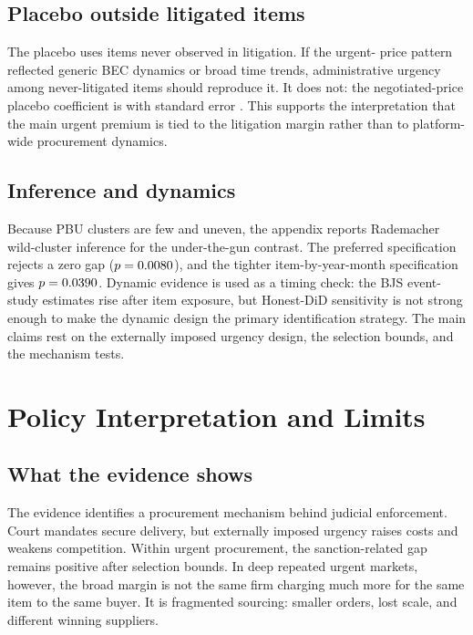 \subsection{Placebo outside litigated items}
\label{subsec:placebo}

The placebo uses items never observed in litigation. If the urgent-
price pattern reflected generic BEC dynamics or broad time trends,
administrative urgency among never-litigated items should reproduce
it. It does not: the negotiated-price placebo coefficient is
\BPplaceboNegCoef{} with standard error \BPplaceboNegSE{}. This
supports the interpretation that the main urgent premium is tied to
the litigation margin rather than to platform-wide procurement
dynamics.

\subsection{Inference and dynamics}
\label{subsec:inference}

Because PBU clusters are few and uneven, the appendix reports
Rademacher wild-cluster inference for the under-the-gun contrast. The
preferred specification rejects a zero gap
($p=0.0080{}$), and the tighter item-by-year-month
specification gives $p=0.0390{}$. Dynamic evidence is
used as a timing check: the BJS event-study estimates
\citep{borusyak2024revisiting} rise after item exposure, but
Honest-DiD sensitivity \citep{rambachan2023more} is not strong enough
to make the dynamic design the primary identification strategy. The
main claims rest on the externally imposed urgency design, the
selection bounds, and the mechanism tests.

\section{Policy Interpretation and Limits}
\label{sec:policy}

\subsection{What the evidence shows}
\label{subsec:shows}

The evidence identifies a procurement mechanism behind judicial
enforcement. Court mandates secure delivery, but externally imposed
urgency raises costs and weakens competition. Within urgent
procurement, the sanction-related gap remains positive after
selection bounds. In deep repeated urgent markets, however, the broad
margin is not the same firm charging much more for the same item to
the same buyer. It is fragmented sourcing: smaller orders, lost
scale, and different winning suppliers.

